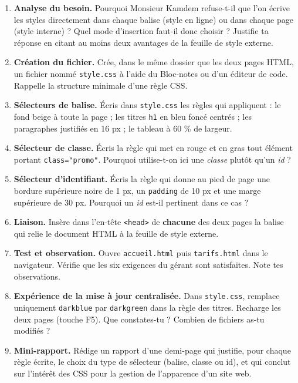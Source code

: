 \documentclass[11pt]{article}
\newcounter{popsec}
\newcounter{popsub}
\newcommand{\courssub}[1]{%
  \stepcounter{popsub}%
  \par\vspace{9pt}\noindent{\popxbold\fontsize{11.5}{13}\selectfont\color{popink}{\color{poporange}\thepopsec.\thepopsub}\hspace{6pt}#1}\par\nopagebreak\vspace{4pt}
}
\begin{document}
\begin{enumerate}
  \item \textbf{Analyse du besoin.} Pourquoi Monsieur Kamdem refuse-t-il que l'on écrive les styles directement dans chaque balise (style en ligne) ou dans chaque page (style interne) ? Quel mode d'insertion faut-il donc choisir ? Justifie ta réponse en citant au moins deux avantages de la feuille de style externe.
  \item \textbf{Création du fichier.} Crée, dans le même dossier que les deux pages HTML, un fichier nommé \texttt{style.css} à l'aide du Bloc-notes ou d'un éditeur de code. Rappelle la structure minimale d'une règle CSS.
  \item \textbf{Sélecteurs de balise.} Écris dans \texttt{style.css} les règles qui appliquent : le fond beige à toute la page ; les titres \texttt{h1} en bleu foncé centrés ; les paragraphes justifiés en 16 px ; le tableau à 60 \% de largeur.
  \item \textbf{Sélecteur de classe.} Écris la règle qui met en rouge et en gras tout élément portant \texttt{class="promo"}. Pourquoi utilise-t-on ici une \emph{classe} plutôt qu'un \emph{id} ?
  \item \textbf{Sélecteur d'identifiant.} Écris la règle qui donne au pied de page une bordure supérieure noire de 1 px, un \texttt{padding} de 10 px et une marge supérieure de 30 px. Pourquoi un \emph{id} est-il pertinent dans ce cas ?
  \item \textbf{Liaison.} Insère dans l'en-tête \texttt{<head>} de \textbf{chacune} des deux pages la balise qui relie le document HTML à la feuille de style externe.
  \item \textbf{Test et observation.} Ouvre \texttt{accueil.html} puis \texttt{tarifs.html} dans le navigateur. Vérifie que les six exigences du gérant sont satisfaites. Note tes observations.
  \item \textbf{Expérience de la mise à jour centralisée.} Dans \texttt{style.css}, remplace uniquement \texttt{darkblue} par \texttt{darkgreen} dans la règle des titres. Recharge les deux pages (touche F5). Que constates-tu ? Combien de fichiers as-tu modifiés ?
  \item \textbf{Mini-rapport.} Rédige un rapport d'une demi-page qui justifie, pour chaque règle écrite, le choix du type de sélecteur (balise, classe ou id), et qui conclut sur l'intérêt des CSS pour la gestion de l'apparence d'un site web.
\end{enumerate}

\courssub{Ressources à mobiliser}
\end{document}
